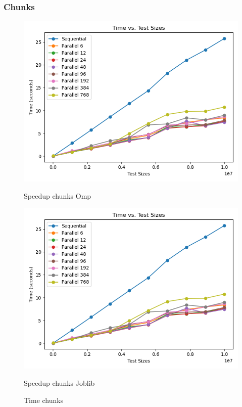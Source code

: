 \documentclass[11pt]{article}
\begin{document}
    \subsubsection{Chunks}\label{subsubsec:chunks}
    \begin{figure}[H]
        \centering
        \includegraphics[width=\linewidth]{plot_chunks_time}
            \caption{Speedup chunks Omp}\label{fig:chunks_time_omp}
        \endminipage\hfill
        \includegraphics[width=\linewidth]{plot_chunks_time}
            \caption{Speedup chunks Joblib}\label{fig:chunks_time_joblib}
        \endminipage\hfill
        \caption{Time chunks}
    \end{figure}
\end{document}
